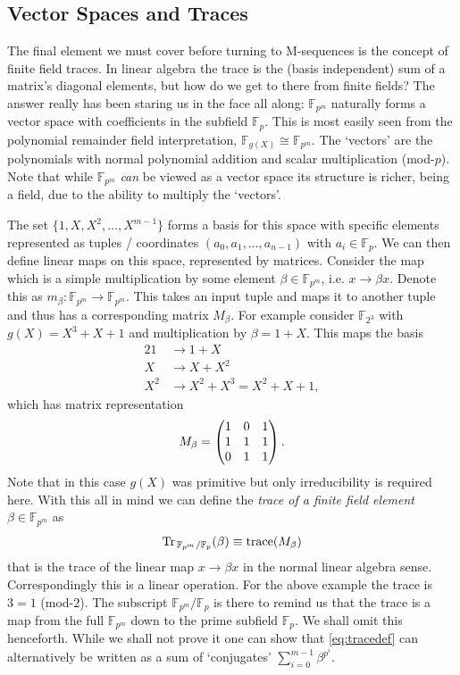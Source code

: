 \documentclass[twocolumn]{revtex4-2}
\begin{document}
\subsection{Vector Spaces and Traces}
The final element we must cover before turning to M-sequences is the concept of finite field traces. In linear algebra the trace is the (basis independent) sum of a matrix's diagonal elements, but how do we get to there from finite fields?
The answer really has been staring us in the face all along: $\mathbb{F}_{p^m}$ naturally forms a vector space with coefficients in the subfield $\mathbb{F}_p$.
This is most easily seen from the polynomial remainder field interpretation, $\mathbb{F}_{g(X)} \cong \mathbb{F}_{p^m}$. The `vectors' are the polynomials with normal polynomial addition and scalar multiplication (mod-$p$).
Note that while $\mathbb{F}_{p^m}$ \emph{can} be viewed as a vector space its structure is richer, being a field, due to the ability to multiply the `vectors'.

The set $\{1, X, X^2, \ldots , X^{m-1}\}$ forms a basis for this space with specific elements represented as tuples / coordinates $(a_0, a_1, \ldots, a_{n-1})$ with $a_i \in \mathbb{F}_p$.
We can then define linear maps on this space, represented by matrices. Consider the map which is a simple multiplication by some element $\beta \in \mathbb{F}_{p^m}$, i.e. $x \to \beta x$. Denote this as $m_\beta : \mathbb{F}_{p^m} \to \mathbb{F}_{p^m}$. 
This takes an input tuple and maps it to another tuple and thus has a corresponding matrix $M_\beta$.
For example consider $\mathbb{F}_{2^3}$ with $g(X) = X^3 + X + 1$ and multiplication by $\beta = 1 + X$. This maps the basis
\begin{alignat}{2}
    1 &\longrightarrow 1+X \nonumber \\[0.1cm]
    X &\longrightarrow X + X^2 \\[0.1cm] 
    X^2 &\longrightarrow X^2 + X^3 = X^2 + X + 1, \nonumber
\end{alignat}
which has matrix representation
\begin{eqnarray}
    M_\beta = \mqty(1 & 0 & 1 \\ 1 & 1 & 1 \\ 0 & 1 & 1) \, .
\end{eqnarray}
Note that in this case $g(X)$ was primitive but only irreducibility is required here. With this all in mind we can define the \emph{trace of a finite field element} $\beta \in \mathbb{F}_{p^m}$ as
\begin{equation}
\label{eq:tracedef}
    \Tr_{\, \mathbb{F}_{p^m}/\mathbb{F}_p}(\beta) \equiv \text{trace}(M_\beta)
\end{equation}
that is the trace of the linear map $x \to \beta x$ in the normal linear algebra sense. Correspondingly this is a linear operation. For the above example the trace is $3 = 1$ (mod-$2$).
The subscript $\mathbb{F}_{p^m}/\mathbb{F}_p$ is there to remind us that the trace is a map from the full $\mathbb{F}_{p^m}$ down to the prime subfield $\mathbb{F}_p$. We shall omit this henceforth.
While we shall not prove it one can show that \eqref{eq:tracedef} can alternatively be written as a sum of `conjugates' $\sum_{i=0}^{m-1} \beta^{p^i}$.
\end{document}

